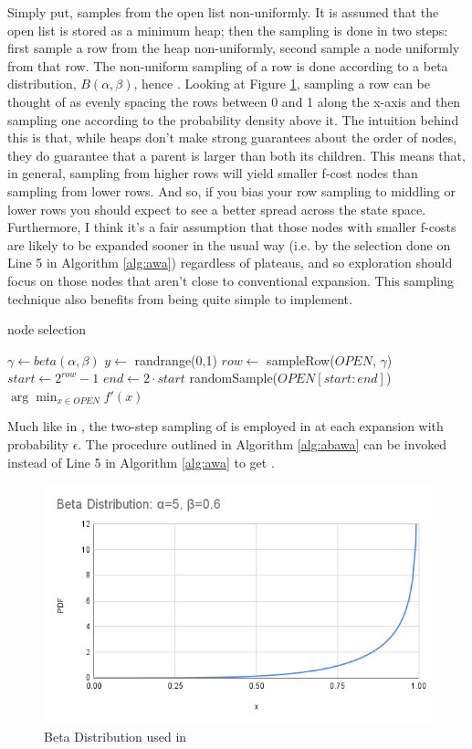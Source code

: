 Simply put, \ebgreedy samples from the open list non-uniformly. It is assumed that the open list is stored as a minimum heap; then the sampling is done in two steps: first sample a row from the heap non-uniformly, second sample a node uniformly from that row. The non-uniform sampling of a row is done according to a beta distribution, $B(\alpha, \beta)$, hence \ebgreedy. Looking at Figure \ref{fig:beta}, sampling a row can be thought of as evenly spacing the rows between 0 and 1 along the x-axis and then sampling one according to the probability density above it. The intuition behind this is that, while heaps don't make strong guarantees about the order of nodes, they do guarantee that a parent is larger than both its children. This means that, in general, sampling from higher rows will yield smaller f-cost nodes than sampling from lower rows. And so, if you bias your row sampling to middling or lower rows you should expect to see a better spread across the state space. Furthermore, I think it's a fair assumption that those nodes with smaller f-costs are likely to be expanded sooner in the usual way (i.e. by the selection done on Line 5 in Algorithm \ref{alg:awa}) regardless of plateaus, and so exploration should focus on those nodes that aren't close to conventional expansion. This sampling technique also benefits from being quite simple to implement.

\begin{algorithm}
\caption{\ebawa node selection}\label{alg:abawa}
\begin{algorithmic}
\Require $\gamma \gets beta(\alpha, \beta)$
\State $y \gets $ randrange(0,1)
    \State $row \gets $ sampleRow($OPEN$, $\gamma$)
    \State $start \gets 2^{row}-1$
    \State $end \gets 2 \cdot start$
    \State \Return randomSample($OPEN[start:end]$)
\Else{}
    \State \Return $\arg \min_{x \in OPEN} f'(x)$
\EndIf
\end{algorithmic}
\end{algorithm}

Much like in \eawa, the two-step sampling of \ebgreedy is employed in \ebawa at each expansion with probability $\epsilon$. The procedure outlined in Algorithm \ref{alg:abawa} can be invoked instead of Line 5 in Algorithm \ref{alg:awa} to get \ebawa.

\noindent
\begin{figure}
    \begin{center}\includegraphics[scale=0.35]{media/beta.png}\end{center}
    \caption{Beta Distribution used in \ebawa}\label{fig:beta}
\end{figure}